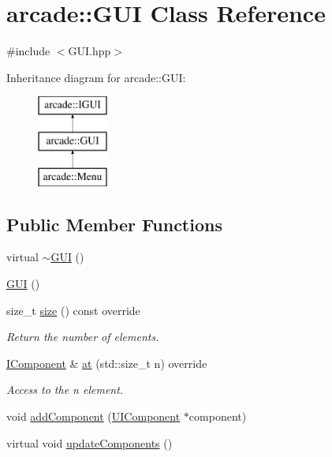 \hypertarget{classarcade_1_1_g_u_i}{}\section{arcade\+:\+:G\+UI Class Reference}
\label{classarcade_1_1_g_u_i}


{\ttfamily \#include $<$G\+U\+I.\+hpp$>$}

Inheritance diagram for arcade\+:\+:G\+UI\+:\begin{figure}[H]
\begin{center}
\leavevmode
\includegraphics[height=3.000000cm]{classarcade_1_1_g_u_i}
\end{center}
\end{figure}
\subsection*{Public Member Functions}
\begin{DoxyCompactItemize}
\item 
virtual \hyperlink{classarcade_1_1_g_u_i_a303ab9f358e535d6e08bcf63a7175a96}{$\sim$\+G\+UI} ()
\item 
\hyperlink{classarcade_1_1_g_u_i_a320bdccbea68b4485ec98667735009d2}{G\+UI} ()
\item 
size\+\_\+t \hyperlink{classarcade_1_1_g_u_i_aa38b306ad674a221e0815cb600409598}{size} () const override
\begin{DoxyCompactList}\small\item\em Return the number of elements. \end{DoxyCompactList}\item 
\hyperlink{classarcade_1_1_i_component}{I\+Component} \& \hyperlink{classarcade_1_1_g_u_i_ab94910ea11fc43430227bfc716fd8c80}{at} (std\+::size\+\_\+t n) override
\begin{DoxyCompactList}\small\item\em Access to the n element. \end{DoxyCompactList}\item 
void \hyperlink{classarcade_1_1_g_u_i_aa6d6547eb12710f098d1a328f5eee7d4}{add\+Component} (\hyperlink{classarcade_1_1_u_i_component}{U\+I\+Component} $\ast$component)
\item 
virtual void \hyperlink{classarcade_1_1_g_u_i_abdf6ff80e7176b8a0e9c4561c5bfbf10}{update\+Components} ()
\end{DoxyCompactItemize}
